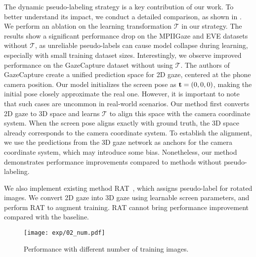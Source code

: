The dynamic pseudo-labeling strategy is a key contribution of our work. To better understand its impact, we conduct a detailed comparison, as shown in . We perform an ablation on the learning transformation $\mathcal{T}$ in our strategy. The results show a significant performance drop on the MPIIGaze and EVE datasets without $\mathcal{T}$, as unreliable pseudo-labels can cause model collapse during learning, especially with small training dataset sizes.
Interestingly, we observe improved performance on the GazeCapture dataset without using $\mathcal{T}$. The authors of GazeCapture create a unified prediction space for 2D gaze, centered at the phone camera position. Our model initializes the screen pose as $\mathbf{t} = (0, 0, 0)$, making the initial pose closely approximate the real one. However, it is important to note that such cases are uncommon in real-world scenarios.
Our method first converts 2D gaze to 3D space and learns $\mathcal{T}$ to align this space with the camera coordinate system. When the screen pose aligns exactly with ground truth, the 3D space already corresponds to the camera coordinate system. To establish the alignment, we use the predictions from the 3D gaze network as anchors for the camera coordinate system, which may introduce some bias. Nonetheless, our method demonstrates performance improvements compared to methods without pseudo-labeling.

We also implement existing method RAT~\cite{Bao_2022_CVPR}, which assigns pseudo-label for rotated images.
We convert 2D gaze into 3D gaze using learnable screen parameters, and perform RAT to augment training. RAT cannot bring performance improvement compared with the baseline.

\begin{figure}
    \begin{minipage}{0.5\linewidth}
        \centering
        \texttt{[image: exp/02\_num.pdf]}
        \caption{Performance with different number of training images.}
        \label{fig:num}
    \end{minipage}
    \quad
    \begin{minipage}{0.43\linewidth}
    \centering
    \label{tab:num}
\end{minipage}
\vspace{-5mm}
\end{figure}

